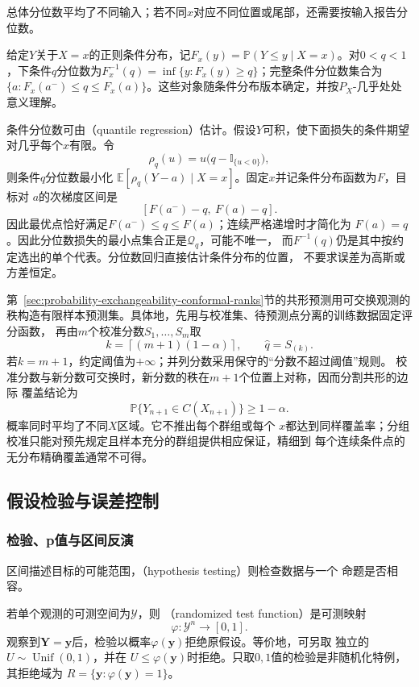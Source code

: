 总体分位数平均了不同输入；若不同\(x\)对应不同位置或尾部，还需要按输入报告分位数。
\begin{definition}[条件分位数]
  \label{def:statistics-conditional-quantile}
给定\(Y\)关于\(X=x\)的正则条件分布，记\(F_x(y)=\mathbb P(Y\leq y\mid X=x)\)。对\(0<q<1\)，下条件\(q\)分位数为\(F_x^{-1}(q)=\inf\{y:F_x(y)\geq q\}\)；完整条件分位数集合为\(\{a:F_x(a^-)\leq q\leq F_x(a)\}\)。这些对象随条件分布版本确定，并按\(P_X\)-几乎处处意义理解。
\end{definition}
条件分位数可由（quantile regression）估计。假设\(Y\)可积，使下面损失的条件期望对几乎每个\(x\)有限。令
\[
  \rho_q(u)=u\bigl(q-\mathbb{I}_{\{u<0\}}\bigr),
\]
则条件\(q\)分位数最小化
\(\mathbb{E}[\rho_q(Y-a)\mid X=x]\)。固定\(x\)并记条件分布函数为\(F\)，目标对
\(a\)的次梯度区间是
\[
  [F(a^-)-q,\ F(a)-q].
\]
因此最优点恰好满足\(F(a^-)\leq q\leq F(a)\)；连续严格递增时才简化为
\(F(a)=q\)。因此分位数损失的最小点集合正是\(\mathcal Q_q\)，可能不唯一，
而\(F^{-1}(q)\)仍是其中按约定选出的单个代表。分位数回归直接估计条件分布的位置，
不要求误差为高斯或方差恒定。

第~\ref{sec:probability-exchangeability-conformal-ranks}节的共形预测用可交换观测的
秩构造有限样本预测集。具体地，先用与校准集、待预测点分离的训练数据固定评分函数，
再由\(m\)个校准分数\(S_1,\ldots,S_m\)取
\[
  k=\left\lceil(m+1)(1-\alpha)\right\rceil,\qquad
  \widehat q=S_{(k)}.
\]
若\(k=m+1\)，约定阈值为\(+\infty\)；并列分数采用保守的“分数不超过阈值”规则。
校准分数与新分数可交换时，新分数的秩在\(m+1\)个位置上对称，因而分割共形的边际
覆盖结论为
\[
  \mathbb{P}\{Y_{n+1}\in C(X_{n+1})\}\geq1-\alpha.
\]
概率同时平均了不同\(X\)区域。它不推出每个群组或每个
\(x\)都达到同样覆盖率；分组校准只能对预先规定且样本充分的群组提供相应保证，精细到
每个连续条件点的无分布精确覆盖通常不可得。

\subsection{假设检验与误差控制}
\label{sec:statistics-testing-errors}

\subsubsection{检验、p值与区间反演}

区间描述目标的可能范围，（hypothesis testing）则检查数据与一个
命题是否相容。
\begin{definition}[随机化检验函数]
  \label{def:statistics-randomized-test-function}
  若单个观测的可测空间为\(\mathcal{Y}\)，则
  （randomized test function）是可测映射
  \[
    \varphi:\mathcal{Y}^n\to[0,1].
  \]
  观察到\(\bm{Y}=\bm{y}\)后，检验以概率\(\varphi(\bm{y})\)拒绝原假设。等价地，可另取
  独立的\(U\sim\operatorname{Unif}(0,1)\)，并在
  \(U\leq\varphi(\bm{y})\)时拒绝。只取\(0,1\)值的检验是非随机化特例，其拒绝域为
  \(R=\{\bm{y}:\varphi(\bm{y})=1\}\)。
\end{definition}

